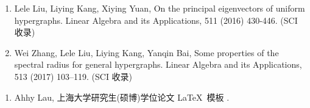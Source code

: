 \begin{publications}
    \begin{enumerate}
    \item Lele Liu, Liying Kang, Xiying Yuan,
    On the principal eigenvectors of uniform hypergraphs.
    Linear Algebra and its Applications, 511 (2016) 430-446. (SCI 收录)
    
    \item Wei Zhang, Lele Liu, Liying Kang, Yanqin Bai,
    Some properties of the spectral radius for general hypergraphs.
    Linear Algebra and its Applications, 513 (2017) 103–119. (SCI 收录)
    \end{enumerate}
    
    \begin{enumerate}
    \item Ahhy Lau, 上海大学研究生(硕博)学位论文 \LaTeX\ 模板 \shuthesis.
    \end{enumerate}
    \end{publications}%